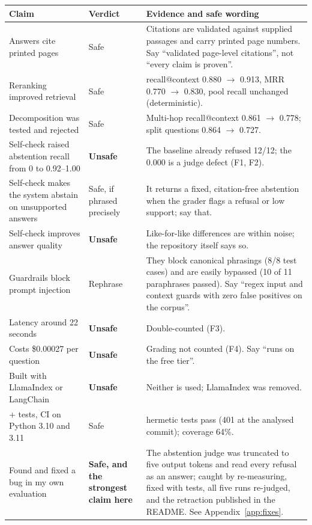 \begin{longtable}{@{}>{\raggedright\arraybackslash}p{5.0cm}>{\raggedright\arraybackslash}p{2.0cm}>{\raggedright\arraybackslash}p{8.8cm}@{}}
\toprule
\textbf{Claim} & \textbf{Verdict} & \textbf{Evidence and safe wording}\\
\midrule
\endhead
Answers cite printed pages & Safe & Citations are validated against supplied passages and carry printed page numbers. Say \enquote{validated page-level citations}, not \enquote{every claim is proven}.\\
Reranking improved retrieval & Safe & recall@context 0.880 $\rightarrow$ 0.913, MRR 0.770 $\rightarrow$ 0.830, pool recall unchanged (deterministic).\\
Decomposition was tested and rejected & Safe & Multi-hop recall@context 0.861 $\rightarrow$ 0.778; split questions 0.864 $\rightarrow$ 0.727.\\
Self-check raised abstention recall from 0 to 0.92--1.00 & \textbf{Unsafe} & The baseline already refused 12/12; the 0.000 is a judge defect (F1, F2).\\
Self-check makes the system abstain on unsupported answers & Safe, if phrased precisely & It returns a fixed, citation-free abstention when the grader flags a refusal or low support; say that.\\
Self-check improves answer quality & \textbf{Unsafe} & Like-for-like differences are within noise; the repository itself says so.\\
Guardrails block prompt injection & Rephrase & They block canonical phrasings (8/8 test cases) and are easily bypassed (10 of 11 paraphrases passed). Say \enquote{regex input and context guards with zero false positives on the corpus}.\\
Latency around 22 seconds & \textbf{Unsafe} & Double-counted (F3).\\
Costs \$0.00027 per question & \textbf{Unsafe} & Grading not counted (F4). Say \enquote{runs on the free tier}.\\
Built with LlamaIndex or LangChain & \textbf{Unsafe} & Neither is used; LlamaIndex was removed.\\
400+ tests, CI on Python 3.10 and 3.11 & Safe & 469 hermetic tests pass (401 at the analysed commit); coverage 64\%.\\
Found and fixed a bug in my own evaluation & \textbf{Safe, and the strongest claim here} & The abstention judge was truncated to five output tokens and read every refusal as an answer; caught by re-measuring, fixed with tests, all five runs re-judged, and the retraction published in the README. See Appendix~\ref{app:fixes}.\\

\end{longtable}

